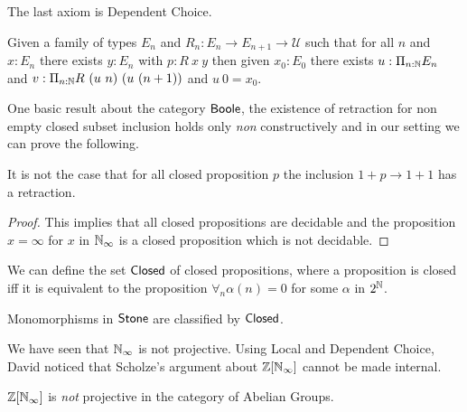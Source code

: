 The last axiom is Dependent Choice.

\begin{axiom}
  Given a family of types $E_n$ and $R_n:E_n\rightarrow E_{n+1}\rightarrow {\mathcal U}$ such that
  for all $n$ and $x:E_n$ there exists $y:E_n$ with $p:R~x~y$ then given $x_0:E_0$ there exists
  $u:\Pi_{n:\mathbb{N}}E_n$ and $v:\Pi_{n:\mathbb{N}}R~(u~n)~(u~(n+1))$ and $u~0 = x_0$.
\end{axiom}

\medskip

One basic result about the category $\mathsf{Boole}$, the existence of retraction for non empty closed subset inclusion
holds only {\em non} constructively and in our setting we can prove the following.


\begin{proposition}
 It is not the case that for all closed proposition $p$ the inclusion $1+p\rightarrow 1+1$ has a retraction.
\end{proposition}

\begin{proof}
  This implies that all closed propositions are decidable and the proposition $x=\infty$ for $x$ in $\mathbb{N}_{\infty}$ is a
  closed proposition which is not decidable.
\end{proof}

\medskip

We can define the set $\mathsf{Closed}$ of closed propositions, where a proposition is closed iff it is equivalent to
the proposition $\forall_n \alpha(n) = 0$ for some $\alpha$ in $2^{\mathbb{N}}$.

\begin{theorem}
  Monomorphisms in $\mathsf{Stone}$ are classified by $\mathsf{Closed}$.
\end{theorem}

\medskip

We have seen that $\mathbb{N}_{\infty}$ is not projective. Using Local and Dependent Choice, David noticed that Scholze's argument
about $\mathbb{Z}[\mathbb{N}_{\infty}]$ cannot be made internal.

\begin{theorem}
   $\mathbb{Z}[\mathbb{N}_{\infty}]$ is {\em not} projective in the category of Abelian Groups.
\end{theorem}

